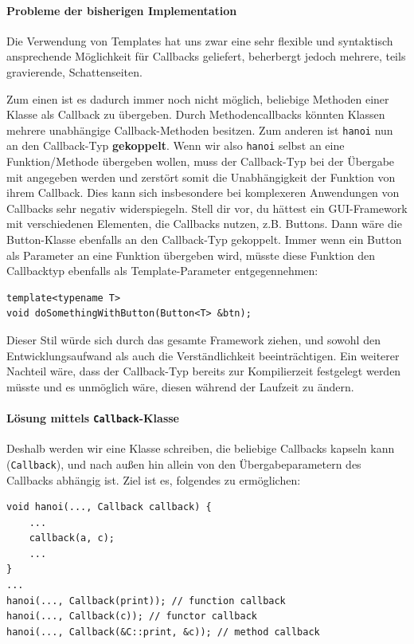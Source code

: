 \paragraph*{Probleme der bisherigen Implementation}
Die Verwendung von Templates hat uns zwar eine sehr flexible und syntaktisch ansprechende Möglichkeit für Callbacks geliefert, beherbergt jedoch mehrere, teils gravierende, Schattenseiten.

Zum einen ist es dadurch immer noch nicht möglich, beliebige Methoden einer Klasse als Callback zu übergeben.
Durch Methodencallbacks könnten Klassen mehrere unabhängige Callback-Methoden besitzen.
Zum anderen ist \lstinline{hanoi} nun an den Callback-Typ \textbf{gekoppelt}.
Wenn wir also \lstinline{hanoi} selbst an eine Funktion/Methode übergeben wollen, muss der Callback-Typ bei der Übergabe mit angegeben werden und zerstört somit die Unabhängigkeit der Funktion von ihrem Callback.
Dies kann sich insbesondere bei komplexeren Anwendungen von Callbacks sehr negativ widerspiegeln.
Stell dir vor, du hättest ein GUI-Framework mit verschiedenen Elementen, die Callbacks nutzen, z.B. Buttons.
Dann wäre die Button-Klasse ebenfalls an den Callback-Typ gekoppelt.
Immer wenn ein Button als Parameter an eine Funktion übergeben wird, müsste diese Funktion den Callbacktyp ebenfalls als Template-Parameter entgegennehmen:

\begin{lstlisting}
template<typename T>
void doSomethingWithButton(Button<T> &btn);
\end{lstlisting}

Dieser Stil würde sich durch das gesamte Framework ziehen, und sowohl den Entwicklungsaufwand als auch die Verständlichkeit beeinträchtigen.
Ein weiterer Nachteil wäre, dass der Callback-Typ bereits zur Kompilierzeit festgelegt werden müsste und es unmöglich wäre, diesen während der Laufzeit zu ändern.

\paragraph*{Lösung mittels \lstinline{Callback}-Klasse}

Deshalb werden wir eine Klasse schreiben, die beliebige Callbacks kapseln kann (\lstinline{Callback}), und nach außen hin allein von den Übergabeparametern des Callbacks abhängig ist.
Ziel ist es, folgendes zu ermöglichen:
\begin{lstlisting}
void hanoi(..., Callback callback) {
	...
	callback(a, c);
	...
}
...
hanoi(..., Callback(print)); // function callback
hanoi(..., Callback(c)); // functor callback
hanoi(..., Callback(&C::print, &c)); // method callback
\end{lstlisting}

